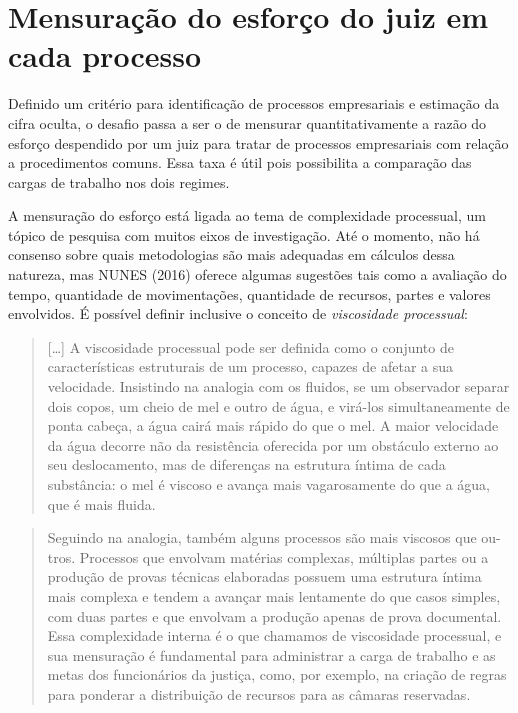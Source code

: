 \documentclass[]{book}
\begin{document}
\section{Mensuração do esforço do juiz em cada
processo}\label{metotempos}

Definido um critério para identificação de processos empresariais e
estimação da cifra oculta, o desafio passa a ser o de mensurar
quantitativamente a razão do esforço despendido por um juiz para tratar
de processos empresariais com relação a procedimentos comuns. Essa taxa
é útil pois possibilita a comparação das cargas de trabalho nos dois
regimes.

A mensuração do esforço está ligada ao tema de complexidade processual,
um tópico de pesquisa com muitos eixos de investigação. Até o momento,
não há consenso sobre quais metodologias são mais adequadas em cálculos
dessa natureza, mas NUNES (2016) oferece algumas sugestões tais como a
avaliação do tempo, quantidade de movimentações, quantidade de recursos,
partes e valores envolvidos. É possível definir inclusive o conceito de
\emph{viscosidade processual}:

\begin{quote}
{[}\ldots{}{]} A viscosidade processual pode ser definida como o
conjunto de características estruturais de um processo, capazes de
afetar a sua velocidade. Insistindo na analogia com os fluidos, se um
observador separar dois copos, um cheio de mel e outro de água, e
virá-los simultaneamente de ponta cabeça, a água cairá mais rápido do
que o mel. A maior velocidade da água decorre não da resistência
oferecida por um obstáculo externo ao seu deslocamento, mas de
diferenças na estrutura íntima de cada substância: o mel é viscoso e
avança mais vagarosamente do que a água, que é mais fluida.
\end{quote}

\begin{quote}
Seguindo na analogia, também alguns processos são mais viscosos que ou-
tros. Processos que envolvam matérias complexas, múltiplas partes ou a
produção de provas técnicas elaboradas possuem uma estrutura íntima mais
complexa e tendem a avançar mais lentamente do que casos simples, com
duas partes e que envolvam a produção apenas de prova documental. Essa
complexidade interna é o que chamamos de viscosidade processual, e sua
mensuração é fundamental para administrar a carga de trabalho e as metas
dos funcionários da justiça, como, por exemplo, na criação de regras
para ponderar a distribuição de recursos para as câmaras reservadas.
\end{quote}
\end{document}
